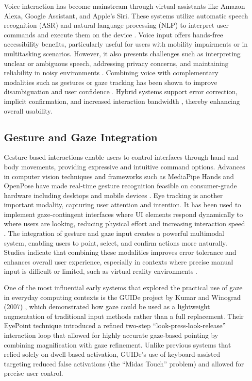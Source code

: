 \documentclass[openany]{book}
\begin{document}
Voice interaction has become mainstream through virtual assistants like Amazon Alexa, Google Assistant, and Apple’s Siri. These systems utilize automatic speech recognition (ASR) and natural language processing (NLP) to interpret user commands and execute them on the device \cite{Hoy02012018}. Voice input offers hands-free accessibility benefits, particularly useful for users with mobility impairments or in multitasking scenarios. However, it also presents challenges such as interpreting unclear or ambiguous speech, addressing privacy concerns, and maintaining reliability in noisy environments \cite{HCI-076}. Combining voice with complementary modalities such as gestures or gaze tracking has been shown to improve disambiguation and user confidence \cite{s21237825}. Hybrid systems support error correction, implicit confirmation, and increased interaction bandwidth \cite{Oviatt2004}, thereby enhancing overall usability.

\subsection{Gesture and Gaze Integration}

Gesture-based interactions enable users to control interfaces through hand and body movements, providing expressive and intuitive command options. Advances in computer vision techniques and frameworks such as MediaPipe Hands and OpenPose have made real-time gesture recognition feasible on consumer-grade hardware including desktops and mobile devices \cite{lugaresi2019mediapipeframeworkbuildingperception}.  
Eye tracking is another important modality, capturing user attention and intention. It has been used to implement gaze-contingent interfaces where UI elements respond dynamically to where users are looking, reducing physical effort and increasing interaction speed \cite{Duchowski2017}.  
The integration of gesture and gaze input creates a powerful multimodal system, enabling users to point, select, and confirm actions more naturally. Studies indicate that combining these modalities improves error tolerance and enhances overall user experience, especially in contexts where precise manual input is difficult or limited, such as virtual reality environments \cite{7893331, Gazeinteractioninthepost-WIMPworld}.

One of the most influential early systems that explored the practical use of gaze in everyday computing contexts is the GUIDe project by Kumar and Winograd (2007) \cite{kumar2007guide}, which demonstrated how gaze could be used as a lightweight augmentation of traditional input methods rather than a full replacement. Their EyePoint technique introduced a refined two-step “look-press-look-release” interaction loop that allowed for highly accurate gaze-based pointing by combining magnification with gaze refinement. Unlike previous systems that relied solely on dwell-based activation, GUIDe’s use of keyboard-assisted targeting reduced false activations (the “Midas Touch” problem) and allowed for precise user control. 
\end{document}

